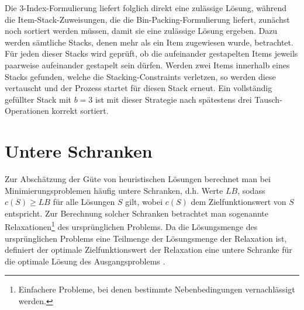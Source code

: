 Die 3-Index-Formulierung liefert folglich direkt eine zulässige Lösung, während die Item-Stack-Zuweisungen, die die Bin-Packing-Formulierung liefert, zunächst noch sortiert werden müssen, damit sie eine zulässige Lösung ergeben.
Dazu werden sämtliche Stacks, denen mehr als ein Item zugewiesen wurde, betrachtet. Für jeden
dieser Stacks wird geprüft, ob die aufeinander gestapelten Items jeweils paarweise aufeinander gestapelt sein dürfen.
Werden zwei Items innerhalb eines Stacks gefunden, welche die Stacking-Constraints verletzen, so werden diese
vertauscht und der Prozess startet für diesen Stack erneut. Ein vollständig gefüllter Stack mit $b = 3$ ist mit dieser
Strategie nach spätestens drei Tausch-Operationen korrekt sortiert.










\section{Untere Schranken}
\label{sec:lower_bounds}

Zur Abschätzung der Güte von heuristischen Lösungen berechnet man bei Minimierungsproblemen häufig untere Schranken,
d.h. Werte $LB$, sodass $c(S) \geq LB$ für alle Lösungen $S$ gilt, wobei $c(S)$ dem Zielfunktionswert von $S$ entspricht.
Zur Berechnung solcher Schranken betrachtet man sogenannte Relaxationen\footnote{Einfachere Probleme, bei denen bestimmte Nebenbedingungen vernachlässigt werden.} des ursprünglichen Problems.
Da die Lösungsmenge des ursprünglichen Problems eine Teilmenge der Lösungsmenge der Relaxation ist,
definiert der optimale Zielfunktionswert der Relaxation eine untere Schranke für die optimale Lösung des Ausgangsproblems
\cite{Knust2017}.

